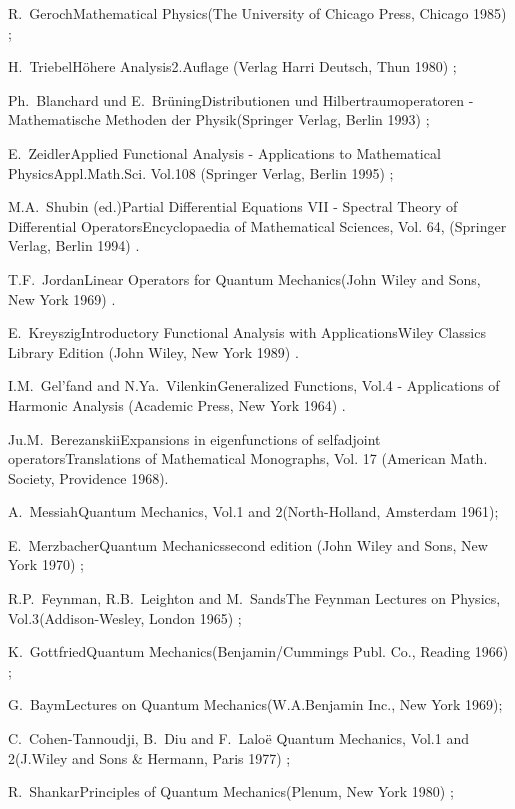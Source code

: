 \documentclass[12pt]{report}
\begin{document}
\begin{thebibliography}{22}
\bookref
{R.~Geroch}{Mathematical Physics}{(The University of Chicago Press,
Chicago 1985) ;}
 
\bookref
{H.~Triebel}{H\"ohere Analysis}{2.Auflage (Verlag Harri Deutsch, Thun
1980) ;}

\bookref
{Ph.~Blanchard und E.~Br\"uning}{Distributionen und 
Hilbertraumoperatoren - Mathematische Methoden der 
Physik}{(Springer Verlag, Berlin 1993) ;} 

\bookref
{E.~Zeidler}{Applied Functional Analysis - Applications to Mathematical
Physics}{Appl.Math.Sci. Vol.108 (Springer Verlag, Berlin 1995) ;}

\bookref
{M.A.~Shubin (ed.)}{Partial Differential Equations VII - 
Spectral Theory of Differential Operators}{Encyclopaedia
of Mathematical Sciences, Vol. 64, (Springer Verlag, Berlin 1994) .} 

 
\bookref
{T.F.~Jordan}{Linear Operators for Quantum Mechanics}{(John
Wiley and Sons, New York 1969) .}


\bookref
{E.~Kreyszig}{Introductory Functional Analysis with Applications}{Wiley
Classics Library Edition (John Wiley, New York 1989) .}

 
\bookref
{I.M.~Gel'fand and N.Ya.~Vilenkin}{Generalized Functions, Vol.4 -
Applications of Harmonic Analysis}{
(Academic Press, New York 1964) .}
 
 
\bookref
{Ju.M.~Berezanskii}{Expansions in eigenfunctions 
of selfadjoint operators}{Translations of Mathematical 
Monographs, Vol. 17 (American Math. Society, Providence 1968).} 

 
\bookref
{A.~Messiah}{Quantum Mechanics, Vol.1 and 2}{(North-Holland, Amsterdam 1961);}
 
\bookref
{E.~Merzbacher}{Quantum Mechanics}{second edition (John
Wiley and Sons, New York 1970) ;}
 
\bookref
{R.P.~Feynman, R.B.~Leighton and M.~Sands}{The Feynman Lectures
on Physics, Vol.3}{(Addison-Wesley, London 1965) ;}
 
\bookref
{K.~Gottfried}{Quantum Mechanics}{(Benjamin/Cummings Publ. Co.,
Reading 1966) ;}
 
\bookref
{G.~Baym}{Lectures on Quantum Mechanics}{(W.A.Benjamin Inc.,
New York 1969);}
 
\bookref
{C.~Cohen-Tannoudji, B.~Diu and F.~Lalo\"e}{
Quantum Mechanics, Vol.1 and 2}{(J.Wiley and Sons \&  
Hermann, Paris 1977) ;}
 
\bookref
{R.~Shankar}{Principles of Quantum Mechanics}{(Plenum, New York 1980) ;}
 

\end{thebibliography}
\end{document}
